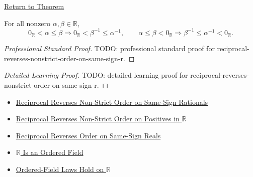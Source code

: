 \newpage
{}
\label{prf:reciprocal-reverses-nonstrict-order-on-same-sign-r}

\begin{remark*}[Return]
\hyperref[thm:reciprocal-reverses-nonstrict-order-on-same-sign-r]{Return to Theorem}
\end{remark*}

\begin{theorem*}
For all nonzero $\alpha,\beta\in\mathbb{R}$,
\[
0_{\mathbb{R}}<\alpha\le\beta
\Longrightarrow
0_{\mathbb{R}}<\beta^{-1}\le\alpha^{-1},
\qquad
\alpha\le\beta<0_{\mathbb{R}}
\Longrightarrow
\beta^{-1}\le\alpha^{-1}<0_{\mathbb{R}}.
\]
\end{theorem*}

\begin{proof}[Professional Standard Proof]
\LRAProofBodyStart
TODO: professional standard proof for reciprocal-reverses-nonstrict-order-on-same-sign-r.
\end{proof}

\begin{proof}[Detailed Learning Proof]
\LRAProofBodyStart
TODO: detailed learning proof for reciprocal-reverses-nonstrict-order-on-same-sign-r.
\end{proof}

\begin{remark*}
\end{remark*}

\begin{dependencies}
\begin{itemize}
  \item \hyperref[thm:reciprocal-reverses-nonstrict-order-on-same-sign-q]{Reciprocal Reverses Non-Strict Order on Same-Sign Rationals}
  \item \hyperref[thm:reciprocal-reverses-nonstrict-order-on-positives-r]{Reciprocal Reverses Non-Strict Order on Positives in $\mathbb{R}$}
  \item \hyperref[thm:reciprocal-reverses-order-on-same-sign-r]{Reciprocal Reverses Order on Same-Sign Reals}
  \item \hyperref[thm:r-is-an-ordered-field]{$\mathbb{R}$ Is an Ordered Field}
  \item \hyperref[cor:ordered-field-laws-on-r]{Ordered-Field Laws Hold on $\mathbb{R}$}
\end{itemize}
\end{dependencies}

\clearpage
